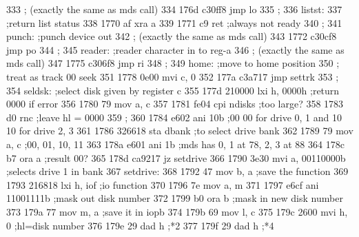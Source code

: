 333                       ;        (exactly the same as mds call)
334      176d c30ff8               jmp      lo
335                       ;
336                       listst:
337                                ;return list status
338      1770 af                   xra      a
339      1771 c9                   ret                 ;always not ready
340                       ;
341                       punch:   ;punch device out
342                       ;        (exactly the same as mds call)
343      1772 c30cf8               jmp      po
344                       ;
345                       reader:  ;reader character in to reg-a
346                       ;        (exactly the same as mds call)
347      1775 c306f8               jmp      ri
348                       ;
349                       home:    ;move to home position
350                       ;        treat as track 00 seek
351      1778 0e00                 mvi      c, 0
352      177a c3a717               jmp      settrk
353                       ;
354                       seldsk:  ;select disk given by register c
355      177d 210000               lxi      h, 0000h   ;return 0000 if error
356      1780 79                   mov      a, c
357      1781 fe04                 cpi      ndisks     ;too large?
358      1783 d0                   rnc                 ;leave hl = 0000
359                       ;
360      1784 e602                 ani      10b        ;00 00 for drive 0, 1 and 10 10 for drive 2, 3
361      1786 326618               sta      dbank      ;to select drive bank
362      1789 79                   mov      a, c       ;00, 01, 10, 11
363      178a e601                 ani      1b         ;mds has 0, 1 at 78, 2, 3 at 88
364      178c b7                   ora      a          ;result 00?
365      178d ca9217               jz       setdrive
366      1790 3e30                 mvi      a, 00110000b     ;selects drive 1 in bank
367                       setdrive:
368      1792 47                   mov      b, a       ;save the function
369      1793 216818               lxi      h, iof     ;io function
370      1796 7e                   mov      a, m
371      1797 e6cf                 ani      11001111b  ;mask out disk number
372      1799 b0                   ora      b          ;mask in new disk number
373      179a 77                   mov      m, a       ;save it in iopb
374      179b 69                   mov      l, c
375      179c 2600                 mvi      h, 0       ;hl=disk number
376      179e 29                   dad      h          ;*2
377      179f 29                   dad      h          ;*4
